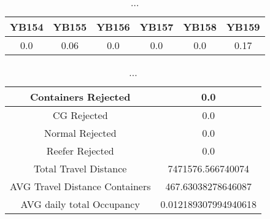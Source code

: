 \documentclass[]{article}
\begin{document}
\begin{table}[h]
      \centering
      \begin{tabular}{|c|c|c|c|c|c|}
            \hline
            YB154 & YB155 & YB156 & YB157 & YB158 & YB159 \\
            \hline
            0.0   & 0.06  & 0.0   & 0.0   & 0.0   & 0.17  \\
            \hline
      \end{tabular}
      \caption{...}
\end{table}
\begin{table}[h]
      \centering
      \begin{tabular}{|c|c|}
            \hline
            Containers Rejected            & 0.0                  \\ \hline
            CG Rejected                    & 0.0                  \\ \hline
            Normal Rejected                & 0.0                  \\ \hline
            Reefer Rejected                & 0.0                  \\ \hline
            Total Travel Distance          & 7471576.566740074    \\ \hline
            AVG Travel Distance Containers & 467.63038278646087   \\ \hline
            AVG daily total Occupancy      & 0.012189307994940618 \\ \hline
      \end{tabular}
      \caption{...}
\end{table}
\end{document}
